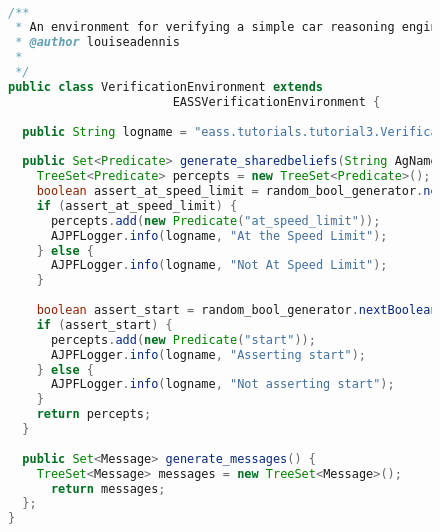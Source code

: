 \begin{figure}[!htpb]
\begin{ourexample}
\label{code:EASSverifenvironment} \quad \\
\begin{lstlisting}[basicstyle=\sffamily,style=easslisting,language=Java]
/**
 * An environment for verifying a simple car reasoning engine.
 * @author louiseadennis
 *
 */
public class VerificationEnvironment extends 
                       EASSVerificationEnvironment {
			
  public String logname = "eass.tutorials.tutorial3.VerificationEnvironment";
	
  public Set<Predicate> generate_sharedbeliefs(String AgName, Action act) {
    TreeSet<Predicate> percepts = new TreeSet<Predicate>();
    boolean assert_at_speed_limit = random_bool_generator.nextBoolean();
    if (assert_at_speed_limit) {
      percepts.add(new Predicate("at_speed_limit"));
      AJPFLogger.info(logname, "At the Speed Limit");
    } else {
      AJPFLogger.info(logname, "Not At Speed Limit");
    }
		
    boolean assert_start = random_bool_generator.nextBoolean();
    if (assert_start) {
      percepts.add(new Predicate("start"));
      AJPFLogger.info(logname, "Asserting start");
    } else {
      AJPFLogger.info(logname, "Not asserting start");
    }
    return percepts;
  }
	
  public Set<Message> generate_messages() {
    TreeSet<Message> messages = new TreeSet<Message>();
      return messages;
  };
}
\end{lstlisting}
\end{ourexample}
\end{figure}
